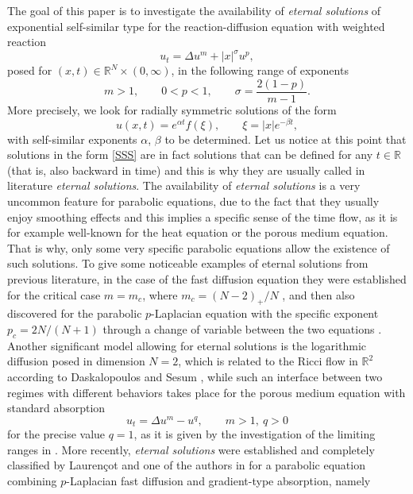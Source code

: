 \documentclass[a4paper,11pt]{article}
\numberwithin{equation}{section}
\newcommand{\real}{\mathbb{R}}
\let\ced=\c         %
\begin{document}
The goal of this paper is to investigate the availability of \emph{eternal solutions} of exponential self-similar type for the reaction-diffusion equation with weighted reaction
\begin{equation}\label{eq1}
u_t=\Delta u^m+|x|^{\sigma}u^p,
\end{equation}
posed for $(x,t)\in\real^N\times(0,\infty)$, in the following range of exponents
\begin{equation}\label{exp}
m>1, \qquad 0<p<1, \qquad \sigma=\frac{2(1-p)}{m-1}.
\end{equation}
More precisely, we look for radially symmetric solutions of the form
\begin{equation}\label{SSS}
u(x,t)=e^{\alpha t}f(\xi), \qquad \xi=|x|e^{-\beta t},
\end{equation}
with self-similar exponents $\alpha$, $\beta$ to be determined. Let us notice at this point that solutions in the form \eqref{SSS} are in fact solutions that can be defined for any $t\in\real$ (that is, also backward in time) and this is why they are usually called in literature \emph{eternal solutions}. The availability of \emph{eternal solutions} is a very uncommon feature for parabolic equations, due to the fact that they usually enjoy smoothing effects and this implies a specific sense of the time flow, as it is for example well-known for the heat equation or the porous medium equation. That is why, only some very specific parabolic equations allow the existence of such solutions. To give some noticeable examples of eternal solutions from previous literature, in the case of the fast diffusion equation they were established for the critical case $m=m_c$, where $m_c=(N-2)_{+}/N$ \cite{GPV00, VazSm}, and then also discovered for the parabolic $p$-Laplacian equation with the specific exponent $p_c=2N/(N+1)$ through a change of variable between the two equations \cite{ISV08}. Another significant model allowing for eternal solutions is the logarithmic diffusion posed in dimension $N=2$, which is related to the Ricci flow in $\real^2$ according to Daskalopoulos and Sesum \cite{DS06}, while such an interface between two regimes with different behaviors takes place for the porous medium equation with standard absorption
$$
u_t=\Delta u^m-u^q, \qquad m>1, \ q>0
$$
for the precise value $q=1$, as it is given by the investigation of the limiting ranges in \cite{VazquezSurvey}. More recently, \emph{eternal solutions} were established and completely classified by Lauren\ced{c}ot and one of the authors in \cite{IL13} for a parabolic equation combining $p$-Laplacian fast diffusion and gradient-type absorption, namely
\end{document}
